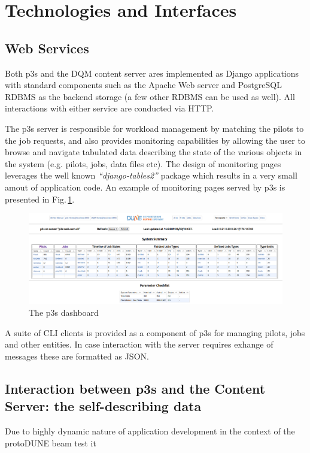 \documentclass{webofc}
\newcommand{\pd}{protoDUNE\xspace}
\begin{document}
\section{Technologies and Interfaces}
\subsection{Web Services}

Both p3s and the DQM content server ares implemented as Django \cite{django} applications
with standard components such as the Apache Web server and PostgreSQL RDBMS as the backend storage
(a few other RDBMS can be used as well). All interactions with either service
are conducted via HTTP.

The p3s server is responsible for workload management by matching the pilots to the job requests,
and also provides monitoring capabilities by allowing the user to browse and navigate
tabulated data describing the state of the various objects in the system (e.g. pilots, jobs, data files etc).
The design of monitoring pages leverages the well known \textit{``django-tables2''} package which results
in a very small amout of application code. An example of monitoring pages served by p3s is
presented in Fig.\,\ref{fig:p3s_dash}.

\begin{figure}[tb]
\centering\includegraphics[width=1.0\textwidth]{figures/p3s_dash_2018_v1.png}
\caption{\label{fig:p3s_dash}The p3s dashboard}
\end{figure}

 A suite of CLI clients is provided as a component of p3s for managing pilots, jobs and
other entities. In case interaction with the server requires exhange of messages these are
formatted as JSON. 

\subsection{Interaction between p3s and the Content Server: the self-describing data}
Due to highly dynamic nature of application development in the context of the \pd beam
test it
\end{document}
